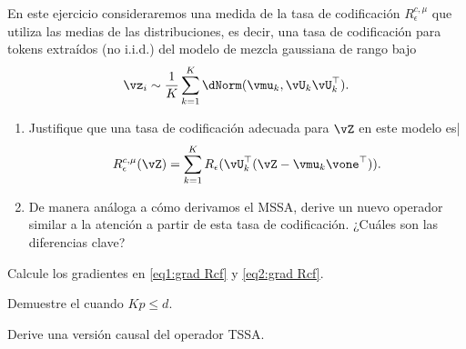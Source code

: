 \documentclass[../../book-main.tex]{subfiles}
\begin{document}
% 

\begin{exercise}
    En este ejercicio consideraremos una medida de la tasa de codificación
    \(R_{\epsilon}^{c, \mu}\) que utiliza las medias de las
    distribuciones, es decir, una tasa de codificación para tokens extraídos (no i.i.d.)
    del modelo de mezcla gaussiana de rango bajo
    \begin{equation}
        \vz_{i} \sim \frac{1}{K}\sum_{k = 1}^{K}\dNorm(\vmu_{k},
        \vU_{k}\vU_{k}^{\top}).
    \end{equation}
    \begin{enumerate}
        \item Justifique que una tasa de codificación adecuada para \(\vZ\)
            en este modelo es|
            \begin{equation}
                R_{\epsilon}^{c, \mu}(\vZ) = \sum_{k =
                1}^{K}R_{\epsilon}(\vU_{k}^{\top}(\vZ - \vmu_{k}\vone^{\top})).
            \end{equation}
        \item De manera análoga a cómo derivamos el MSSA, derive un nuevo
            operador similar a la atención a partir de esta tasa de codificación. ¿Cuáles son
            las diferencias clave?
    \end{enumerate}
\end{exercise}

\begin{exercise}
    Calcule los gradientes en \eqref{eq1:grad Rcf} y
    \eqref{eq2:grad Rcf}.
\end{exercise}

\begin{exercise}
    Demuestre el  cuando $Kp \le d$.
\end{exercise}

\begin{exercise}
    Derive una versión causal del operador TSSA.
\end{exercise}
\end{document}
